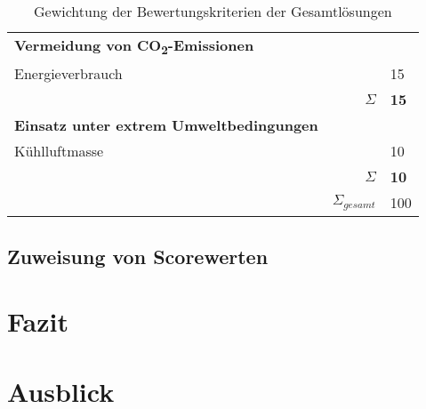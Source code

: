 \begin{table}
\begin{tabularx}{\linewidth}{Xrl}
		\textbf{Vermeidung von CO\textsubscript{2}-Emissionen}   &                   &  \\
		Energieverbrauch                                         &                   & 15              \\ \midrule
		                                                         &          $\Sigma$ & \textbf{15}     \\
		\textbf{Einsatz unter extrem Umweltbedingungen}          &                   &  \\
		Kühlluftmasse                                            &                   & 10              \\ \midrule
		                                                         &          $\Sigma$ & \textbf{10}     \\ \midrule
		                                                         & $\Sigma_{gesamt}$ & 100 \\ \bottomrule
	\end{tabularx}
	\caption{Gewichtung der Bewertungskriterien der Gesamtlösungen}
	\label{tab_bewertungskriterien}
\end{table} 

\subsection{Zuweisung von Scorewerten}





\section{Fazit}
\section{Ausblick}
